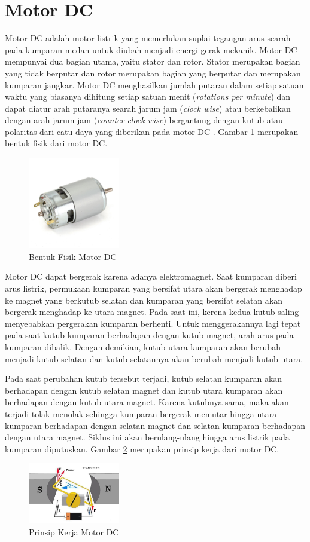\section{Motor DC}
Motor DC adalah motor listrik yang memerlukan suplai tegangan arus searah pada kumparan medan untuk diubah menjadi energi gerak mekanik. Motor DC mempunyai dua bagian utama, yaitu stator dan rotor. Stator merupakan bagian yang tidak berputar dan rotor merupakan bagian yang berputar dan merupakan kumparan jangkar. Motor DC menghasilkan jumlah putaran dalam setiap satuan waktu yang biasanya dihitung setiap satuan menit (\textit{rotations per minute}) dan dapat diatur arah putaranya searah jarum jam (\textit{clock wise}) atau berkebalikan dengan arah jarum jam (\textit{counter clock wise}) bergantung dengan kutub atau polaritas dari catu daya yang diberikan pada motor DC \cite{dickson}. Gambar \ref{pic.motordc} merupakan bentuk fisik dari motor DC.
	\begin{figure}[H]
	\centering
	\includegraphics[width=4cm]{gambar/motorDC.jpeg}
	\caption{Bentuk Fisik Motor DC}
	\label{pic.motordc}
\end{figure}

Motor DC dapat bergerak karena adanya elektromagnet. Saat kumparan diberi arus listrik, permukaan kumparan yang bersifat utara akan bergerak menghadap ke magnet yang berkutub selatan dan kumparan yang bersifat selatan akan bergerak menghadap ke utara magnet. Pada saat ini, kerena kedua kutub saling menyebabkan pergerakan kumparan berhenti. Untuk menggerakannya lagi tepat pada saat kutub kumparan berhadapan dengan kutub magnet, arah arus pada kumparan dibalik. Dengan demikian, kutub utara kumparan akan berubah menjadi kutub selatan dan kutub selatannya akan berubah menjadi kutub utara\cite{otomotif}.  

Pada saat perubahan kutub tersebut terjadi, kutub selatan kumparan akan berhadapan dengan kutub selatan magnet dan kutub utara kumparan akan berhadapan dengan kutub utara magnet. Karena kutubnya sama, maka akan terjadi tolak menolak sehingga kumparan bergerak memutar hingga utara kumparan berhadapan dengan selatan magnet dan selatan kumparan berhadapan dengan utara magnet. Siklus ini akan berulang-ulang hingga arus listrik pada kumparan diputuskan. Gambar \ref{pic.motordcprinsipkerja} merupakan prinsip kerja dari motor DC.
	\begin{figure}[H]
	\centering
	\includegraphics[width=4cm]{gambar/prinsipDC.jpg}
	\caption{Prinsip Kerja Motor DC}
	\label{pic.motordcprinsipkerja}
\end{figure}


